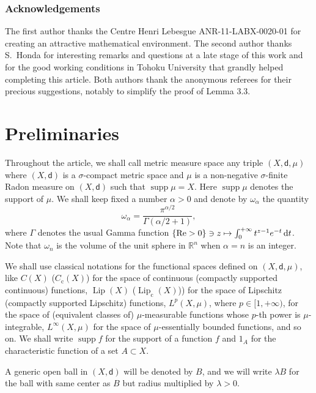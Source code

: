 \documentclass[10pt]{amsart}
\newcommand\mto{\mathchoice{\longmapsto}{\mapsto}{\mapsto}{\mapsto}}
\newcommand{\rmc}{\mathrm{c}}
\theoremstyle{plain}
\theoremstyle{definition}
\newcommand{\setR}{\mathbb{R}}
\newcommand{\di}{\mathop{}\!\mathrm{d}}
\DeclareMathOperator{\supp}{supp}
\DeclareMathOperator{\Lip}{Lip}
\newcommand{\dist}{\mathsf{d}}
\begin{document}
\subsubsection*{Acknowledgements}
The first author thanks the Centre Henri Lebesgue ANR-11-LABX-0020-01 for creating an attractive mathematical environment. The second author thanks S.~Honda for interesting remarks and questions at a late stage of this work and for the good working conditions in Tohoku University that grandly helped completing this article. Both authors thank the anonymous referees for their precious suggestions, notably to simplify the proof of Lemma 3.3.

\section{Preliminaries}\label{sec:2}

Throughout the article, we shall call metric measure space any triple $(X,\dist,\mu)$ where $(X,\dist)$ is a $\sigma$-compact metric space and $\mu$ is a non-negative $\sigma$-finite Radon measure on $(X,\dist)$ such that $\supp \mu = X$. Here $\supp \mu$ denotes the support of $\mu$. We shall keep fixed a number $\alpha>0$ and denote by $\omega_\alpha$ the quantity
\begin{equation}\label{eq:omega_n}
\omega_\alpha = \frac{\pi^{\alpha/2}}{\Gamma(\alpha/2+1)},
\end{equation}
where $\Gamma$ denotes the usual Gamma function $\{\mathrm{Re}>0\} \ni z \mto \int_0^{+\infty} t^{z-1}e^{-t} \di t$. Note that $\omega_n$ is the volume of the unit sphere in $\setR^n$ when $\alpha=n$ is an integer.

We shall use classical notations for the functional spaces defined on $(X,\dist, \mu)$, like $C(X)$ (\resp $C_\rmc(X)$) for the space of continuous (\resp compactly supported continuous) functions, $\Lip(X)$ (\resp $\Lip_\rmc(X)$)) for the space of Lipschitz (\resp compactly supported Lipschitz) functions, $L^p(X,\mu)$, where $p \in [1,+\infty)$, for the space of (equivalent classes of) $\mu$-measurable functions whose $p$-th power is $\mu$-integrable, $L^\infty(X,\mu)$ for the space of $\mu$-essentially bounded functions, and so on.
We shall write $\supp f$ for the support of a function $f$ and $1_A$ for the characteristic function of a set $A \subset X$.

A generic open ball in $(X,\dist)$ will be denoted by $B$, and we will write $\lambda B$ for the ball with same center as $B$ but radius multiplied by $\lambda>0$.
\end{document}
